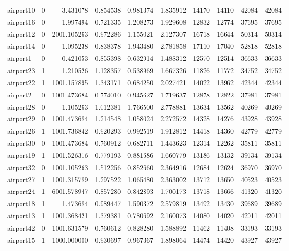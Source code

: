 \begin{longtable}{|l|r|r|r|r|r|r|r|r|r|}
airport10 & 0 & 3.431078 & 0.854538 & 0.981374 & 1.835912 & 14170 & 14110 & 42084 & 42084 \\
airport16 & 0 & 1.997494 & 0.721335 & 1.208273 & 1.929608 & 12832 & 12774 & 37695 & 37695 \\
airport12 & 0 & 2001.105263 & 0.972286 & 1.155021 & 2.127307 & 16718 & 16644 & 50314 & 50314 \\
airport14 & 0 & 1.095238 & 0.838378 & 1.943480 & 2.781858 & 17110 & 17040 & 52818 & 52818 \\
airport1 & 0 & 0.421053 & 0.855398 & 0.632914 & 1.488312 & 12570 & 12514 & 36633 & 36633 \\
airport23 & 1 & 1.210526 & 1.128357 & 0.538969 & 1.667326 & 11826 & 11772 & 34752 & 34752 \\
airport22 & 1 & 1001.157895 & 1.343171 & 0.684250 & 2.027421 & 14022 & 13962 & 42344 & 42344 \\
airport2 & 0 & 1001.473684 & 0.774010 & 0.945627 & 1.719637 & 12878 & 12822 & 37981 & 37981 \\
airport28 & 0 & 1.105263 & 1.012381 & 1.766500 & 2.778881 & 13634 & 13562 & 40269 & 40269 \\
airport29 & 0 & 1001.473684 & 1.214548 & 1.058024 & 2.272572 & 14328 & 14276 & 43928 & 43928 \\
airport26 & 1 & 1001.736842 & 0.920293 & 0.992519 & 1.912812 & 14418 & 14360 & 42779 & 42779 \\
airport30 & 0 & 1001.473684 & 0.760912 & 0.682711 & 1.443623 & 12314 & 12262 & 35811 & 35811 \\
airport19 & 1 & 1001.526316 & 0.779193 & 0.881586 & 1.660779 & 13186 & 13132 & 39134 & 39134 \\
airport32 & 0 & 1001.105263 & 1.512256 & 0.852660 & 2.364916 & 12684 & 12624 & 36970 & 36970 \\
airport27 & 1 & 1001.315789 & 1.297522 & 1.065480 & 2.363002 & 13712 & 13650 & 40523 & 40523 \\
airport24 & 1 & 6001.578947 & 0.857280 & 0.842893 & 1.700173 & 13718 & 13666 & 41320 & 41320 \\
airport18 & 1 & 1.473684 & 0.989447 & 1.590372 & 2.579819 & 13492 & 13430 & 39689 & 39689 \\
airport13 & 1 & 1001.368421 & 1.379381 & 0.780692 & 2.160073 & 14080 & 14020 & 42011 & 42011 \\
airport42 & 0 & 1001.631579 & 0.760612 & 0.828280 & 1.588892 & 11462 & 11408 & 33193 & 33193 \\
airport15 & 1 & 1000.000000 & 0.930697 & 0.967367 & 1.898064 & 14474 & 14420 & 43927 & 43927 \\

\end{longtable}
